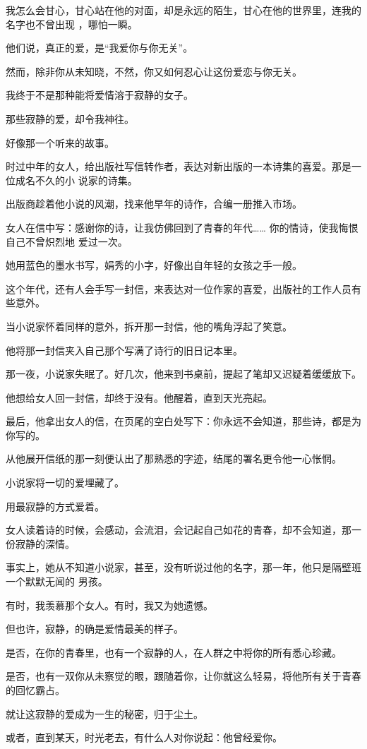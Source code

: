 \documentclass[12pt,a4paper]{article}
\def\blankrev{\vspace{1ex}}									%
\begin{document}
		我怎么会甘心，甘心站在他的对面，却是永远的陌生，甘心在他的世界里，连我的名字也不曾出现
	，哪怕一瞬。

		他们说，真正的爱，是“我爱你与你无关”。\par
		然而，除非你从未知晓，不然，你又如何忍心让这份爱恋与你无关。\par
		我终于不是那种能将爱情溶于寂静的女子。

		\blankrev
		那些寂静的爱，却令我神往。\par
		好像那一个听来的故事。

		时过中年的女人，给出版社写信转作者，表达对新出版的一本诗集的喜爱。那是一位成名不久的小
	说家的诗集。

		出版商趁着他小说的风潮，找来他早年的诗作，合编一册推入市场。

		女人在信中写：感谢你的诗，让我仿佛回到了青春的年代…… 你的情诗，使我悔恨自己不曾炽烈地
	爱过一次。

		她用蓝色的墨水书写，娟秀的小字，好像出自年轻的女孩之手一般。\par
		这个年代，还有人会手写一封信，来表达对一位作家的喜爱，出版社的工作人员有些意外。\par
		当小说家怀着同样的意外，拆开那一封信，他的嘴角浮起了笑意。\par
		他将那一封信夹入自己那个写满了诗行的旧日记本里。\par
		那一夜，小说家失眠了。好几次，他来到书桌前，提起了笔却又迟疑着缓缓放下。\par
		他想给女人回一封信，却终于没有。他醒着，直到天光亮起。\par
		最后，他拿出女人的信，在页尾的空白处写下：你永远不会知道，那些诗，都是为你写的。\par
		从他展开信纸的那一刻便认出了那熟悉的字迹，结尾的署名更令他一心怅惘。\par
		小说家将一切的爱埋藏了。\par
		用最寂静的方式爱着。\par
		女人读着诗的时候，会感动，会流泪，会记起自己如花的青春，却不会知道，那一份寂静的深情。

		事实上，她从不知道小说家，甚至，没有听说过他的名字，那一年，他只是隔壁班一个默默无闻的
	男孩。

		\blankrev
		有时，我羡慕那个女人。有时，我又为她遗憾。\par
		但也许，寂静，的确是爱情最美的样子。\par
		是否，在你的青春里，也有一个寂静的人，在人群之中将你的所有悉心珍藏。\par
		是否，也有一双你从未察觉的眼，跟随着你，让你就这么轻易，将他所有关于青春的回忆霸占。\par
		就让这寂静的爱成为一生的秘密，归于尘土。\par
		或者，直到某天，时光老去，有什么人对你说起：他曾经爱你。
\end{document}
